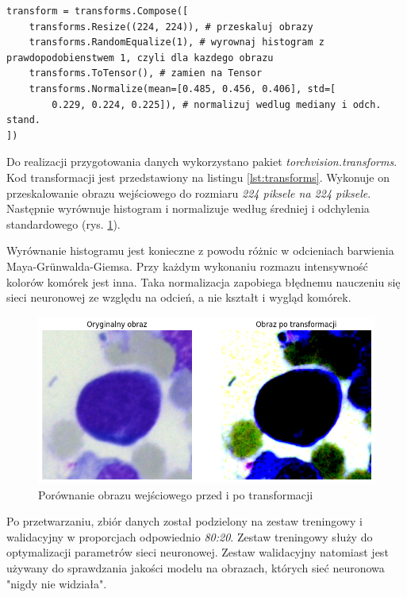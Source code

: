 \begin{lstlisting}[language=ipython,caption={Transformacja danych}, label={lst:transforms}]
transform = transforms.Compose([
    transforms.Resize((224, 224)), # przeskaluj obrazy
    transforms.RandomEqualize(1), # wyrownaj histogram z prawdopodobienstwem 1, czyli dla kazdego obrazu
    transforms.ToTensor(), # zamien na Tensor
    transforms.Normalize(mean=[0.485, 0.456, 0.406], std=[
        0.229, 0.224, 0.225]), # normalizuj wedlug mediany i odch. stand.
])
\end{lstlisting}

Do realizacji przygotowania danych wykorzystano pakiet \textit{torchvision.transforms}.
Kod transformacji jest przedstawiony na listingu \ref{lst:transforms}.
Wykonuje on przeskalowanie obrazu wejściowego do rozmiaru \textit{224 piksele na 224 piksele}.
Następnie wyrównuje histogram i normalizuje według średniej i odchylenia standardowego (rys. \ref{fig:transformations_example}).

Wyrównanie histogramu jest konieczne z powodu różnic w odcieniach barwienia Maya-Grünwalda-Giemsa.
Przy każdym wykonaniu rozmazu intensywność kolorów komórek jest inna.
Taka normalizacja zapobiega błędnemu nauczeniu się sieci neuronowej ze względu na odcień, a nie kształt i wygląd komórek.

\begin{figure}
    \centering
    \includegraphics[width=\textwidth]{image_transform}
    \caption{Porównanie obrazu wejściowego przed i po transformacji}
    \label{fig:transformations_example}
\end{figure}

Po przetwarzaniu, zbiór danych został podzielony na zestaw treningowy i walidacyjny w proporcjach odpowiednio \textit{80:20}.
Zestaw treningowy służy do optymalizacji parametrów sieci neuronowej.
Zestaw walidacyjny natomiast jest używany do sprawdzania jakości modelu na obrazach, których sieć neuronowa "nigdy nie widziała".

